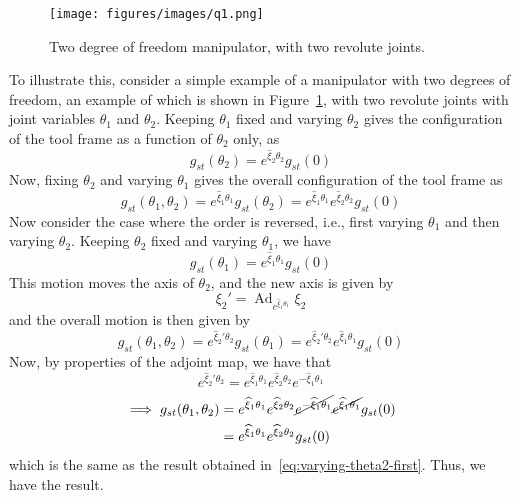 \newpage
\begin{figure}[htb]
    \centering
    \texttt{[image: figures/images/q1.png]}
    \caption{
        Two degree of freedom manipulator, with two revolute joints.
    }\label{fig:2dof-manipulator}
\end{figure}

To illustrate this, consider a simple example of a manipulator with two degrees of freedom, an example of which is shown in Figure~\ref{fig:2dof-manipulator}, with two revolute joints with joint variables \( \theta_1 \) and \( \theta_2 \).
Keeping \( \theta_1 \) fixed and varying \( \theta_2 \) gives the configuration of the tool frame as a function of \( \theta_2 \) only, as
\begin{equation}
    g_{st}(\theta_2)
    =
    e^{\widehat{\xi}_2 \theta_2}
    g_{st}(0)
\end{equation}
Now, fixing \( \theta_2 \) and varying \( \theta_1 \) gives the overall configuration of the tool frame as
\begin{equation}\label{eq:varying-theta2-first}
    g_{st}(\theta_1, \theta_2)
    =
    e^{\widehat{\xi}_1 \theta_1}
    g_{st}(\theta_2)
    =
    e^{\widehat{\xi}_1 \theta_1}
    e^{\widehat{\xi}_2 \theta_2}
    g_{st}(0)
\end{equation}
Now consider the case where the order is reversed, i.e., first varying \( \theta_1 \) and then varying \( \theta_2 \).
Keeping \( \theta_2 \) fixed and varying \( \theta_1 \), we have
\begin{equation}
    g_{st}(\theta_1)
    =
    e^{\widehat{\xi}_1 \theta_1}
    g_{st}(0)
\end{equation}
This motion moves the axis of \( \theta_2 \), and the new axis is given by
\begin{equation}
    \xi_2'
    =
    \operatorname{Ad}_{e^{\widehat{\xi}_1 \theta_1}} \xi_2
\end{equation}
and the overall motion is then given by
\begin{equation}
    g_{st}(\theta_1, \theta_2)
    =
    e^{\widehat{\xi}_2' \theta_2}
    g_{st}(\theta_1)
    =
    e^{\widehat{\xi}_2' \theta_2}
    e^{\widehat{\xi}_1 \theta_1}
    g_{st}(0)
\end{equation}
Now, by properties of the adjoint map, we have that
\begin{equation}
    e^{\widehat{\xi}_2' \theta_2}
    =
    e^{\widehat{\xi}_1 \theta_1}
    e^{\widehat{\xi}_2 \theta_2}
    e^{-\widehat{\xi}_1 \theta_1}
\end{equation}
\begin{align}
    \implies
    g_{st}(\theta_1, \theta_2)
     & =
    e^{\widehat{\xi}_1 \theta_1}
    e^{\widehat{\xi}_2 \theta_2}
    \cancel{e^{-\widehat{\xi}_1 \theta_1}}
    \cancel{e^{\widehat{\xi}_1 \theta_1}}
    g_{st}(0)
    \nonumber
    \\ & =
    e^{\widehat{\xi}_1 \theta_1}
    e^{\widehat{\xi}_2 \theta_2}
    g_{st}(0)
\end{align}
which is the same as the result obtained in~\eqref{eq:varying-theta2-first}.
Thus, we have the result.
